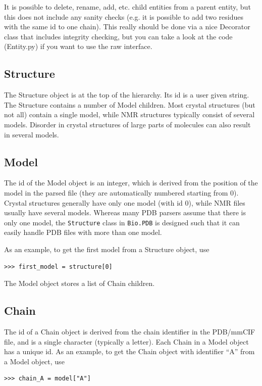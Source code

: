 It is possible to delete, rename, add, etc. child entities from a parent entity,
but this does not include any sanity checks (e.g. it is possible to add two
residues with the same id to one chain). This really should be done via a nice
Decorator class that includes integrity checking, but you can take a look at
the code (Entity.py) if you want to use the raw interface.

\subsection{Structure}

The Structure object is at the top of the hierarchy. Its id is a user given
string. The Structure contains a number of Model children. Most crystal structures
(but not all) contain a single model, while NMR structures typically consist
of several models. Disorder in crystal structures of large parts of molecules
can also result in several models.

\subsection{Model}

The id of the Model object is an integer, which is derived from the position
of the model in the parsed file (they are automatically numbered starting from
0).
Crystal structures generally have only one model (with id 0), while NMR files usually have several models. Whereas many PDB parsers assume that there is only one model, the \verb+Structure+ class in \verb+Bio.PDB+ is designed such that it can easily handle PDB files with more than one model.

As an example, to get the first model from a Structure object, use
\begin{verbatim}
>>> first_model = structure[0]
\end{verbatim}

The Model object stores a list of Chain children.

\subsection{Chain}

The id of a Chain object is derived from the chain identifier in the PDB/mmCIF
file, and is a single character (typically a letter). Each Chain in a Model object has a unique id. As an example, to get the Chain object with identifier ``A'' from a Model object, use
\begin{verbatim}
>>> chain_A = model["A"]
\end{verbatim}

